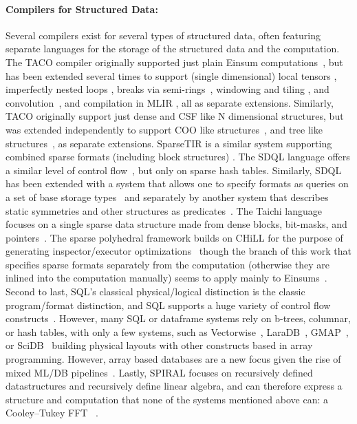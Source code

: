\paragraph{ Compilers for Structured Data:}
Several compilers exist for several types of structured data, often featuring separate languages for the storage of the structured data and the computation.
%
The TACO compiler originally supported just plain Einsum computations~\cite{kjolstad_tensor_2017}, but has been extended several times to support (single dimensional) local tensors \cite{kjolstad_tensor_2019}, imperfectly nested loops \cite{dias_sparselnr_2022}, breaks via semi-rings~\cite{henry_compilation_2021}, windowing and tiling \cite{senanayake_sparse_2020}, and convolution~\cite{won_unified_2023}, and compilation in MLIR \cite{bik_compiler_2022}, all as separate extensions.
%
Similarly, TACO originally support just dense and CSF like N dimensional structures, but was extended independently to support COO like structures~\cite{chou_format_2018}, and tree like structures~\cite{chou_compilation_2022}, as separate extensions. SparseTIR is a similar system supporting combined 
sparse formats (including block structures) \cite{ye_sparsetir_2023}.
%
The SDQL language offers a similar level of control flow~\cite{shaikhha_functional_2022}, but only on sparse hash tables.
%
Similarly, SDQL has been extended with a system that allows one to specify formats as queries on a set of base storage types~\cite{schleich_optimizing_2023} and separately by another system that describes static symmetries and other structures as predicates~\cite{ghorbani_compiling_2023}.
%
The Taichi language focuses on a single sparse data structure made from dense blocks, bit-masks, and pointers~\cite{hu_taichi_2019}.
%
%
The sparse polyhedral framework builds on CHiLL for the purpose of generating inspector/executor optimizations~\cite{strout_sparse_2018} though the branch of this work that specifies sparse formats separately from the computation (otherwise they are inlined into the computation manually) seems to apply mainly to Einsums~\cite{zhao_polyhedral_2022}.
%
Second to last, SQL's classical physical/logical distinction is the classic program/format distinction, and SQL supports a huge variety of control flow constructs~\cite{kotlyar_relational_1997,date_guide_1989}.
%
However, many SQL or dataframe systems rely on b-trees, columnar, or hash tables, with only a few systems, such as Vectorwise~\cite{boncz_vectorwise_2012}, LaraDB~\cite{hutchison_laradb_2017}, GMAP~\cite{tsatalos_gmap_1996}, or SciDB~\cite{stonebraker_scidb_2013} building physical layouts with other constructs based in array programming.
%
However, array based databases are a new focus given the rise of mixed ML/DB pipelines~\cite{baumann_array_2021,luo_scalable_2018}.
%
Lastly, SPIRAL focuses on recursively defined datastructures and recursively define linear algebra, and can therefore express a structure and computation that none of the systems mentioned above can: a Cooley–Tukey FFT ~\cite{franchetti_spiral_2018,franchetti_operator_2009}.
%

